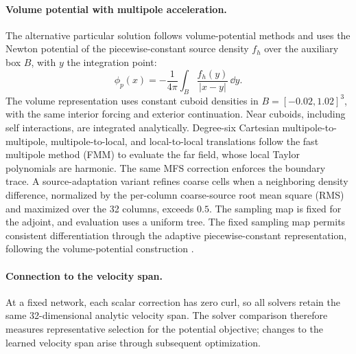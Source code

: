 \paragraph{Volume potential with multipole acceleration.}
{The alternative particular solution follows volume-potential methods \citep{malhotra2016volume} and uses the Newton potential of the piecewise-constant source density $f_h$ over the auxiliary box $B$, with $y$ the integration point:}
\begin{equation}
\phi_p(x)=-\frac1{4\pi}\int_B\frac{f_h(y)}{|x-y|}\,\dd y.
\end{equation}
The volume representation uses constant cuboid densities in $B=[-0.02,1.02]^3$, with the same interior forcing and exterior continuation. Near cuboids, including self interactions, are integrated analytically. {Degree-six Cartesian multipole-to-multipole, multipole-to-local, and local-to-local translations follow the fast multipole method (FMM) \citep{greengard1987fast} to evaluate the far field, whose local Taylor polynomials are harmonic.} The same MFS correction enforces the boundary trace. A source-adaptation variant refines coarse cells when a neighboring density difference, normalized by the per-column coarse-source root mean square (RMS) and maximized over the 32 columns, exceeds $0.5$. The sampling map is fixed for the adjoint, and evaluation uses a uniform tree. The fixed sampling map permits consistent differentiation through the adaptive piecewise-constant representation, following the volume-potential construction \citep{malhotra2016volume}.



\paragraph{Connection to the velocity span.}
At a fixed network, each scalar correction has zero curl, so all solvers retain the same 32-dimensional analytic velocity span. The solver comparison therefore measures representative selection for the potential objective; changes to the learned velocity span arise through subsequent optimization.
